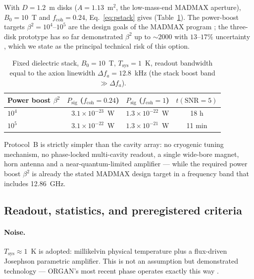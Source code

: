 \documentclass[11pt,a4paper]{article}
\begin{document}
With $D = 1.2$~m disks ($A = 1.13$~m$^2$, the low-mass-end MADMAX aperture),
$B_0 = 10$~T and $f_{\mathrm{coh}} = 0.24$, Eq.~\eqref{eq:pstack} gives
(Table~\ref{tab:stack}). The power-boost targets $\beta^2 = 10^4$--$10^5$ are
the design goals of the MADMAX program \cite{MADMAX2019}; the three-disk
prototype has so far demonstrated $\beta^2$ up to ${\sim}2000$ with
$13$--$17\%$ uncertainty \cite{MADMAXproto}, which we state as the principal
technical risk of this option.

\begin{table}[h]
\centering
\caption{Fixed dielectric stack, $B_0 = 10$~T, $T_{\mathrm{sys}} = 1$~K,
readout bandwidth equal to the axion linewidth $\Delta f_a = 12.8$~kHz
(the stack boost band $\gg \Delta f_a$).}
\label{tab:stack}
\begin{tabular}{lccc}
\toprule
Power boost $\beta^2$ & $P_{\mathrm{sig}}$ ($f_{\mathrm{coh}}=0.24$) & $P_{\mathrm{sig}}$ ($f_{\mathrm{coh}}=1$) & $t(\text{SNR}=5)$ \\
\midrule
$10^{4}$ & $3.1\times 10^{-23}$~W & $1.3\times 10^{-22}$~W & 18 h \\
$10^{5}$ & $3.1\times 10^{-22}$~W & $1.3\times 10^{-21}$~W & 11 min \\
\bottomrule
\end{tabular}
\end{table}

Protocol~B is strictly simpler than the cavity array: no cryogenic tuning
mechanism, no phase-locked multi-cavity readout, a single wide-bore magnet,
horn antenna and a near-quantum-limited amplifier --- while the required power
boost $\beta^2$ is already the stated MADMAX design target in a frequency band
that includes 12.86~GHz.

\subsection{Readout, statistics, and preregistered criteria}
\label{sec:stats}

\paragraph{Noise.} $T_{\mathrm{sys}} \approx 1$~K is adopted: millikelvin
physical temperature plus a flux-driven Josephson parametric amplifier. This is
not an assumption but demonstrated technology --- ORGAN's most recent phase
operates exactly this way \cite{ORGAN26}.
\end{document}
